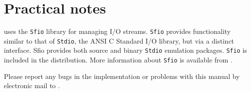 \section{Practical notes}
\pads{} uses the \texttt{Sfio} library for managing I/O
streams. \texttt{Sfio} provides functionality similar to that of
\texttt{Stdio}, the ANSI C Standard I/O library, but via a distinct
interface.  Sfio provides both source and binary \texttt{Stdio}
emulation packages. \texttt{Sfio} is included in the \pads{}
distribution.  More information about \texttt{Sfio} is available from
.


Please report any bugs in the \PADS{} implementation or problems with
this manual by electronic mail to .
